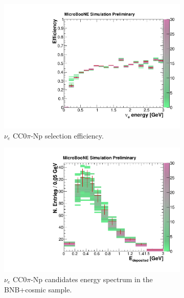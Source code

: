 \begin{figure}[htbp]
  \begin{center}
    \begin{subfigure}{0.45\textwidth}
      \includegraphics[width=\linewidth]{figures/eff_ene_flux.pdf}
      \caption{$\nu_{e}$ CC0$\pi$-Np selection efficiency.}  \label{fig:eff_flux}
    \end{subfigure}
    \begin{subfigure}{0.45\textwidth}
      \includegraphics[width=\linewidth]{figures/reco_flux.pdf}
      \caption{$\nu_{e}$ CC0$\pi$-Np candidates energy spectrum in the BNB+cosmic sample.}  \label{fig:reco_flux}
    \end{subfigure}
    \begin{subfigure}{0.45\textwidth}

\end{subfigure}
\end{center}
\end{figure}

